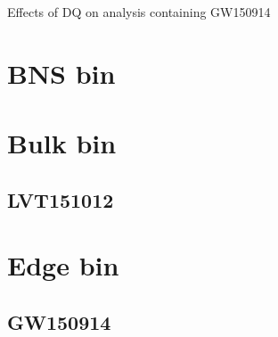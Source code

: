 Effects of DQ on analysis containing GW150914

\section{BNS bin}

\section{Bulk bin}

\subsection{LVT151012}

\section{Edge bin}

\subsection{GW150914}


